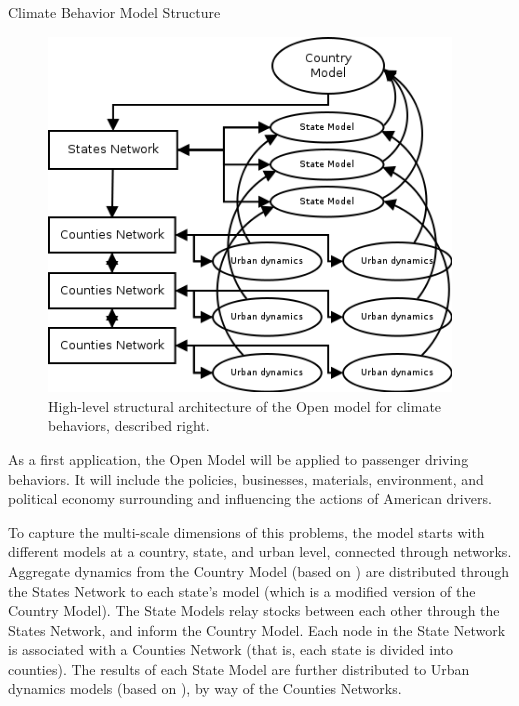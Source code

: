 \documentclass[final]{beamer}
\newlength{\twocolwid}
\begin{document}
\begin{frame}[fragile]
\begin{columns}[t]
\begin{column}{\twocolwid}
    \vspace{.5cm}
      \begin{block}{Climate Behavior Model Structure}
        \begin{figure}
          \includegraphics[width=.21\textwidth,height=3.704in]{../opendoc/architecture.png}
          \caption*{High-level structural architecture of the Open
            model for climate behaviors, described right.}
        \end{figure}

        As a first application, the Open Model will be applied to
        passenger driving behaviors.  It will include the policies,
        businesses, materials, environment, and political economy
        surrounding and influencing the actions of American drivers.
       
        \vspace{.5cm}
        To capture the multi-scale dimensions of this problems, the
        model starts with different models at a country, state, and
        urban level, connected through networks.  Aggregate dynamics
        from the Country Model (based on \cite{meadows2004limits}) are
        distributed through the States Network to each state's model
        (which is a modified version of the Country Model). The State
        Models relay stocks between each other through the States
        Network, and inform the Country Model. Each node in the State
        Network is associated with a Counties Network (that is, each
        state is divided into counties). The results of each State
        Model are further distributed to Urban dynamics models (based
        on \cite{forrester1971urban}), by way of the Counties
        Networks.


\end{block}
\end{column}
\end{columns}
\end{frame}
\end{document}
